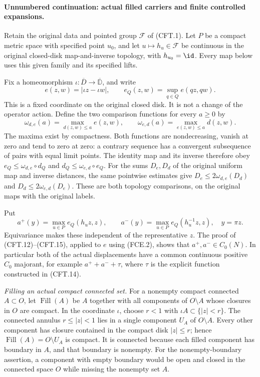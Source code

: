 \paragraph{Unnumbered continuation: actual filled carriers and finite controlled expansions.}
Retain the original data and pointed group $\mathscr F$ of
(CFT.1). Let $P$ be a compact metric space with specified point
$u_0$, and let $u\mapsto h_u\in\mathscr F$ be continuous in
the original closed-disk map-and-inverse topology, with
$h_{u_0}=\id$. Every map below uses this given family and its
specified lifts.

Fix a homeomorphism $\iota:\overline D\to\overline{\mathbb D}$,
and write
\[
 e(z,w)=|\iota z-\iota w|,\qquad
 e_Q(z,w)=\sup_{q\in Q}e(qz,qw).
                                                               \tag{FCE.1}
\]
This is a fixed coordinate on the original closed disk. It is
not a change of the operator action. Define the two comparison
functions for every $a\geq0$ by
\[
 \omega_{d,e}(a)=\max_{d(z,w)\leq a}e(z,w),\qquad
 \omega_{e,d}(a)=\max_{e(z,w)\leq a}d(z,w).
                                                               \tag{FCE.2}
\]
The maxima exist by compactness. Both functions are nondecreasing,
vanish at zero and tend to zero at zero: a contrary sequence has
a convergent subsequence of pairs with equal limit points. The
identity map and its inverse therefore obey
$e_Q\leq\omega_{d,e}\circ d_Q$ and
$d_Q\leq\omega_{e,d}\circ e_Q$. For the sums $D_e,D_d$ of
the original uniform map and inverse distances, the same
pointwise estimates give
$D_e\leq2\omega_{d,e}(D_d)$ and
$D_d\leq2\omega_{e,d}(D_e)$. These are both topology
comparisons, on the original maps with the original labels.

Put
\[
 a^+(y)=\max_{u\in P}e_Q(h_uz,z),\qquad
 a^-(y)=\max_{u\in P}e_Q(h_u^{-1}z,z),\quad y=\pi z.
                                                               \tag{FCE.3}
\]
Equivariance makes these independent of the representative $z$.
The proof of (CFT.12)--(CFT.15), applied to $e$ using (FCE.2),
shows that $a^+,a^-\in C_0(N)$. In particular both of the
actual displacements have a common continuous positive
$C_0$ majorant, for example $a^++a^-+\tau$, where $\tau$
is the explicit function constructed in (CFT.14).

\emph{Filling an actual compact connected set.}
For a nonempty compact connected $A\subset O$, let
$\operatorname{Fill}(A)$ be $A$ together with all components
of $O\setminus A$ whose closures in $O$ are compact.
In the coordinate $\iota$, choose $r<1$ with
$\iota A\subset\{|z|<r\}$. The connected annulus
$r\leq|z|<1$ lies in a single component $U_A$ of
$O\setminus A$. Every other component has closure contained
in the compact disk $|z|\leq r$; hence
$\operatorname{Fill}(A)=O\setminus U_A$ is compact.
It is connected because each filled component has boundary
in $A$, and that boundary is nonempty. For the nonempty-boundary
assertion, a component with empty boundary would be open and
closed in the connected space $O$ while missing the nonempty
set $A$.

